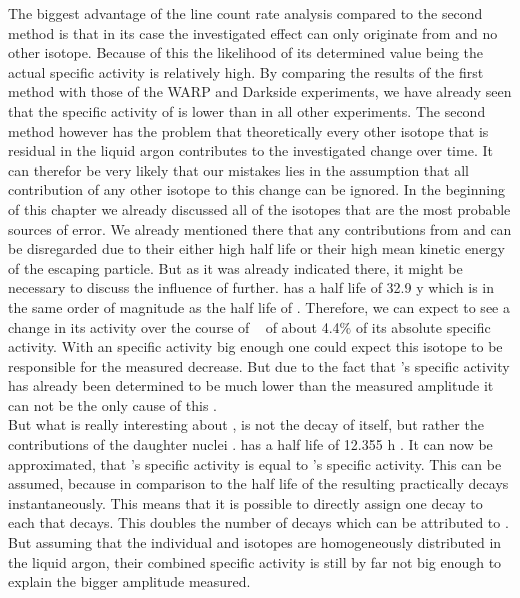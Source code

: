 The biggest advantage of the line count rate analysis compared to the second method is that in its case the investigated effect can only originate from \Kr and no other isotope.
Because of this the likelihood of its determined value being the actual specific activity is relatively high.
By comparing the results of the first method with those of the WARP and Darkside experiments, we have already seen that the specific activity of \Kr is lower than in all other experiments.
The second method however has the problem that theoretically every other isotope that is residual in the liquid argon contributes to the investigated change over time.
It can therefor be very likely that our mistakes lies in the assumption that all contribution of any other isotope to this change can be ignored. 
In the beginning of this chapter we already discussed all of the isotopes that are the most probable sources of error.
We already mentioned there that any contributions from  and  can be disregarded due to their either high half life or their high mean kinetic energy of the escaping particle.
But as it was already indicated there, it might be necessary to discuss the influence of  further.
 has a half life of 32.9 y which is in the same order of magnitude as the half life of \Kr.
Therefore, we can expect to see a change in its activity over the course of \PII~ of about 4.4$\%$ of its absolute specific activity.
With an specific activity big enough one could expect this isotope to be responsible for the measured decrease.
But due to the fact that 's specific activity has already been determined to be much lower than the measured amplitude it can not be the only cause of this .
\\

But what is really interesting about , is not the decay of  itself, but rather the contributions of the daughter nuclei .
 has a half life of 12.355 h \cite{chen_nuclear_2016}.
It can now be approximated, that 's specific activity is equal to 's specific activity.
This can be assumed, because in comparison to the half life of  the resulting  practically decays instantaneously.
This means that it is possible to directly assign one  decay to each  that decays.
This doubles the number of decays which can be attributed to .
But assuming that the individual  and  isotopes are homogeneously distributed in the liquid argon, their combined specific activity is still by far not big enough to explain the bigger amplitude measured.
\\

